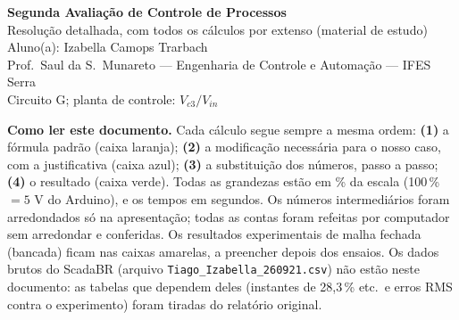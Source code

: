 \documentclass[11pt,a4paper]{article}
\newcommand{\Vc}[1]{V_{c#1}}
\newcommand{\Vin}{V_{in}}
\begin{document}
\begin{center}
{\LARGE\bfseries Segunda Avaliação de Controle de Processos}\\[4pt]
{\Large Resolução detalhada, com todos os cálculos por extenso (material de estudo)}\\[8pt]
Aluno(a): Izabella Camops Trarbach\\
Prof.\ Saul da S.\ Munareto --- Engenharia de Controle e Automação --- IFES Serra\\
Circuito G; planta de controle: $\Vc3/\Vin$
\end{center}

\begin{tcolorbox}[colback=gray!6,colframe=gray!60]
\textbf{Como ler este documento.} Cada cálculo segue sempre a mesma ordem:
\textbf{(1)} a fórmula padrão (caixa laranja); \textbf{(2)} a modificação necessária para o nosso caso, com a justificativa (caixa azul);
\textbf{(3)} a substituição dos números, passo a passo; \textbf{(4)} o resultado (caixa verde).
Todas as grandezas estão em \% da escala (100\,\% $=5$ V do Arduino), e os tempos em segundos.
Os números intermediários foram arredondados só na apresentação; todas as contas foram refeitas por computador sem arredondar e conferidas.
Os resultados experimentais de malha fechada (bancada) ficam nas caixas amarelas, a preencher depois dos ensaios.
Os dados brutos do ScadaBR (arquivo \texttt{Tiago\_Izabella\_260921.csv}) não estão neste documento: as tabelas que dependem deles (instantes de 28,3\,\% etc.\ e erros RMS contra o experimento) foram tiradas do relatório original.
\end{tcolorbox}

\tableofcontents
\newpage


\end{document}

